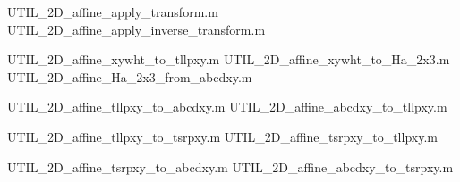 \newpage
				{UTIL_2D_affine_apply_transform.m}
		{UTIL_2D_affine_apply_inverse_transform.m}

\newpage
				{UTIL_2D_affine_xywht_to_tllpxy.m}
				{UTIL_2D_affine_xywht_to_Ha_2x3.m}
			{UTIL_2D_affine_Ha_2x3_from_abcdxy.m}

\newpage
				{UTIL_2D_affine_tllpxy_to_abcdxy.m}
				{UTIL_2D_affine_abcdxy_to_tllpxy.m}

\newpage
				{UTIL_2D_affine_tllpxy_to_tsrpxy.m}
				{UTIL_2D_affine_tsrpxy_to_tllpxy.m}

\newpage
				{UTIL_2D_affine_tsrpxy_to_abcdxy.m}
				{UTIL_2D_affine_abcdxy_to_tsrpxy.m}
    
    

    
    





\normalsize


